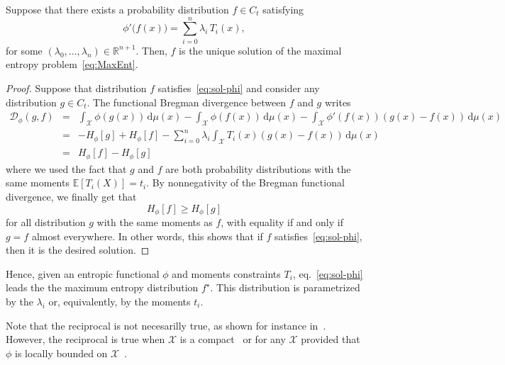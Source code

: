 \documentclass[entropy,article,submit,moreauthors,pdftex]{Definitions/mdpi}
\def\dmu{\mathrm{d}\mu}
\def\fD{\mathcal{D}}
\def\Rset{\mathbb{R}}
\def\X{\mathcal{X}}
\newcommand{\Esp}[1]{\mathbb{E}\left[ #1 \right]}
\begin{document}
\begin{Proposition}
\label{prop:sol-phi}
%
  Suppose that there exists a probability distribution $f \in C_t$ satisfying
  \begin{equation}\label{eq:sol-phi}
  \phi'\big(f(x)\big) = \sum_{i=0}^n \lambda_i \, T_i(x),
  \end{equation}
  for  some $(\lambda_0,\ldots,\lambda_n)  \in \Rset^{n+1}$.   Then, $f$  is the
  unique solution of the maximal entropy problem~\eqref{eq:MaxEnt}.
\end{Proposition}
%
\begin{proof}
  Suppose that  distribution $f$  satisfies~\eqref{eq:sol-phi} and  consider any
  distribution $g \in  C_t$.  The functional Bregman divergence  between $f$ and
  $g$ writes
  \begin{eqnarray*}
  \fD_\phi(g,f) & = & \int_\X \phi(g(x)) \, \dmu(x) - \int_\X \phi(f(x)) \,
  \dmu(x) - \int_\X \phi'(f(x)) \left( g(x) - f(x) \right) \, \dmu(x)
  \\[2mm]
  & = & - H_\phi[g] + H_\phi[f] - \sum_{i=0}^n \lambda_i \int_\X T_i(x) \left(
  g(x) - f(x) \right) \, \dmu(x)
  \\[2mm]
  & = & H_\phi[f] - H_\phi[g]
  \end{eqnarray*}
  where we  used the fact  that $g$ and  $f$ are both  probability distributions
  with the same  moments $\Esp{T_i(X)} = t_i$.  By nonnegativity  of the Bregman
  functional divergence, we finally get that
  \[
  H_\phi[f] \ge H_\phi[g]
  \]
  for all distribution  $g$ with the same  moments as $f$, with  equality if and
  only if  $g = f$ almost  everywhere.  In other  words, this shows that  if $f$
  satisfies~\eqref{eq:sol-phi}, then it is the desired solution.
\end{proof}

Hence,  given  an entropic  functional  $\phi$  and moments  constraints  $T_i$,
eq.~\eqref{eq:sol-phi}  leads the  the maximum  entropy distribution  $f^\star$.
This distribution  is parametrized by  the $\lambda_i$ or, equivalently,  by the
moments $t_i$.

Note  that  the reciprocal  is  not  necesarilly  true,  as shown  for  instance
in~\cite{BorLew93}.   However,   the  reciprocal   is  true   when  $\X$   is  a
compact~\cite{Gir97} or for any $\X$ provided  that $\phi$ is locally bounded on
$\X$~\cite{Gir07}.




\end{document}
